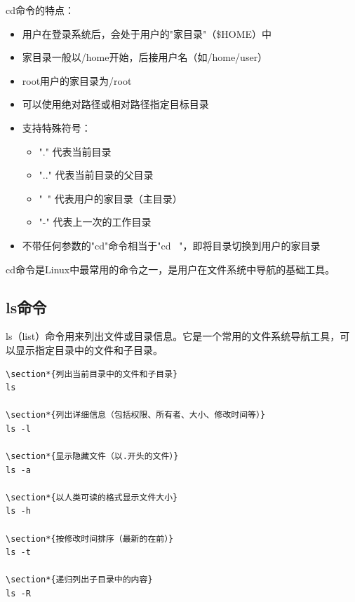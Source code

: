 \documentclass[12pt,UTF8]{ctexbook}
\begin{document}
cd命令的特点：
\begin{itemize}
    \item 用户在登录系统后，会处于用户的"家目录"（\$HOME）中
    \item 家目录一般以/home开始，后接用户名（如/home/user）
    \item root用户的家目录为/root
    \item 可以使用绝对路径或相对路径指定目标目录
    \item 支持特殊符号：
        \begin{itemize}
            \item "." 代表当前目录
            \item ".." 代表当前目录的父目录
            \item "~" 代表用户的家目录（主目录）
            \item "-" 代表上一次的工作目录
        \end{itemize}
    \item 不带任何参数的"cd"命令相当于"cd ~"，即将目录切换到用户的家目录
\end{itemize}

cd命令是Linux中最常用的命令之一，是用户在文件系统中导航的基础工具。

\subsection{ls命令}
ls（list）命令用来列出文件或目录信息。它是一个常用的文件系统导航工具，可以显示指定目录中的文件和子目录。

\begin{verbatim}
\section*{列出当前目录中的文件和子目录}
ls

\section*{列出详细信息（包括权限、所有者、大小、修改时间等）}
ls -l

\section*{显示隐藏文件（以.开头的文件）}
ls -a

\section*{以人类可读的格式显示文件大小}
ls -h

\section*{按修改时间排序（最新的在前）}
ls -t

\section*{递归列出子目录中的内容}
ls -R
\end{verbatim}
\end{document}
